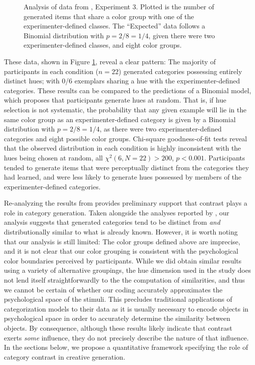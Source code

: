 \documentclass[12pt]{article}
\newcommand\inputpgf[2]{{
\let\pgfimageWithoutPath\pgfimage
\renewcommand{\pgfimage}[2][]{\pgfimageWithoutPath[##1]{#1/##2}}

}}
\begin{document}
\begin{flushleft}
\begin{figure}
    \begin{center}
        \inputpgf{figs/}{jk13-huecontrast.pgf}
        \caption{Analysis of data from \cite{jern2013probabilistic}, Experiment 3. Plotted is the number of generated items that share a color group with one of the experimenter-defined classes. The ``Expected'' data follows a Binomial distribution with $p=2/8=1/4$, given there were two experimenter-defined classes, and eight color groups.}
        \label{fig:jk13-huecontrast}
    \end{center}
\end{figure}

These data, shown in Figure \ref{fig:jk13-huecontrast}, reveal a clear pattern: The majority of participants in each condition ($n = 22$) generated categories possessing entirely distinct hues; with 0/6 exemplars sharing a hue with the experimenter-defined categories. These results can be compared to the predictions of a Binomial model, which proposes that participants generate hues at random. That is, if hue selection is not systematic, the probability that any given example will lie in the same color group as an experimenter-defined category is given by a Binomial distribution with $p = 2/8=1/4$, as there were two experimenter-defined categories and eight possible color groups. Chi-square goodness-of-fit tests reveal that the observed distribution in each condition is highly inconsistent with the hues being chosen at random, all $\chi^2(6,N=22)>200$, $p<0.001$. Participants tended to generate items that were perceptually distinct from the categories they had learned, and were less likely to generate hues possessed by members of the experimenter-defined categories.

Re-analyzing the results from \cite{jern2013probabilistic} provides preliminary support that contrast plays a role in category generation. Taken alongside the analyses reported by \cite{jern2013probabilistic}, our analysis suggests that generated categories tend to be distinct from {\em and} distributionally similar to what is already known. However, it is worth noting that our analysis is still limited: The color groups defined above are imprecise, and it is not clear that our color grouping is consistent with the psychological color boundaries perceived by participants. While we did obtain similar results using a variety of alternative groupings, the hue dimension used in the \cite{jern2013probabilistic} study does not lend itself straightforwardly to the the computation of similarities, and thus we cannot be certain of whether our coding accurately approximates the psychological space of the stimuli. This precludes traditional applications of categorization models to their data as it is usually necessary to encode objects in psychological space in order to accurately determine the similarity between objects. By consequence, although these results likely indicate that contrast exerts {\em some} influence, they do not precisely describe the nature of that influence. In the sections below, we propose a quantitative framework specifying the role of category contrast in creative generation.



\end{flushleft}
\end{document}

